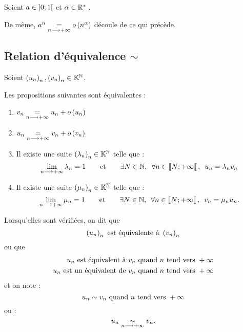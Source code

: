 \begin{dem}
Soient \(a\in\left]0;1\right[\) et \(\alpha\in\mathbb{R}_-^*\).

De même, \(a^n\underset{n\longrightarrow+\infty}{=}o\left(n^\alpha\right)\) découle de ce qui précède.
\end{dem}

\subsection{Relation d'équivalence \(\sim\)}

\begin{defprop}
Soient \(\left(u_n\right)_n,\left(v_n\right)_n\in\mathbb{K}^{\mathbb{N}}\).

Les propositions suivantes sont équivalentes :

\begin{enumerate}
    \item \(v_n\underset{n\longrightarrow+\infty}{=}u_n+o\left(u_n\right)\) \\
    \item \(u_n\underset{n\longrightarrow+\infty}{=}v_n+o\left(v_n\right)\) \\
    \item Il existe une suite \(\left(\lambda_n\right)_n\in\mathbb{K}^{\mathbb{N}}\) telle que : \[\lim_{n\to\pinf}\lambda_n=1\qquad\text{et}\qquad\quantifs{\exists N\in\N;\forall n\in\interventierie{N}{\pinf}}u_n=\lambda_nv_n\]
    \item Il existe une suite \(\left(\mu_n\right)_n\in\mathbb{K}^{\mathbb{N}}\) telle que : \[\lim_{n\to\pinf}\mu_n=1\qquad\text{et}\qquad\quantifs{\exists N\in\N;\forall n\in\interventierie{N}{\pinf}}v_n=\mu_nu_n.\]
\end{enumerate}

Lorsqu'elles sont vérifiées, on dit que \[\left(u_n\right)_n\text{ est équivalente à }\left(v_n\right)_n\] ou que \[\begin{aligned}
u_n\text{ est équivalent à }v_n\text{ quand }n\text{ tend vers }+\infty \\
u_n\text{ est un équivalent de }v_n\text{ quand }n\text{ tend vers }+\infty
\end{aligned}\] et on note : \[u_n\sim v_n\text{ quand }n\text{ tend vers }+\infty\] ou : \[u_n\underset{n\longrightarrow+\infty}{\sim}v_n.\]
\end{defprop}

